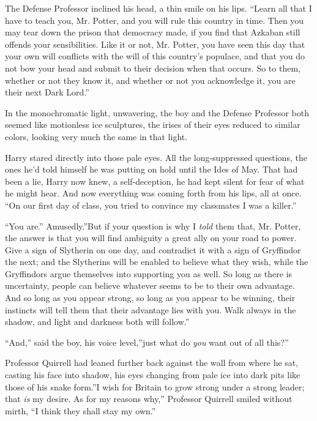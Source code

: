 The Defense Professor inclined his head, a thin smile on his lips.
``Learn all that I have to teach you, Mr. Potter, and you will rule this
country in time. Then you may tear down the prison that democracy made,
if you find that Azkaban still offends your sensibilities. Like it or
not, Mr. Potter, you have seen this day that your own will conflicts
with the will of this country's populace, and that you do not bow your
head and submit to their decision when that occurs. So to them, whether
or not they know it, and whether or not you acknowledge it, you are
their next Dark Lord.''

In the monochromatic light, unwavering, the boy and the Defense
Professor both seemed like motionless ice sculptures, the irises of
their eyes reduced to similar colors, looking very much the same in that
light.

Harry stared directly into those pale eyes. All the long-suppressed
questions, the ones he'd told himself he was putting on hold until the
Ides of May. That had been a lie, Harry now knew, a self-deception, he
had kept silent for fear of what he might hear. And now everything was
coming forth from his lips, all at once. ``On our first day of class,
you tried to convince my classmates I was a killer.''

``You are.'' Amusedly.''But if your question is why I \emph{told} them
that, Mr. Potter, the answer is that you will find ambiguity a great
ally on your road to power. Give a sign of Slytherin on one day, and
contradict it with a sign of Gryffindor the next; and the Slytherins
will be enabled to believe what they wish, while the Gryffindors argue
themselves into supporting you as well. So long as there is uncertainty,
people can believe whatever seems to be to their own advantage. And so
long as you appear strong, so long as you appear to be winning, their
instincts will tell them that their advantage lies with you. Walk always
in the shadow, and light and darkness both will follow.''

``And,'' said the boy, his voice level,''just what do \emph{you} want
out of all this?''

Professor Quirrell had leaned further back against the wall from where
he sat, casting his face into shadow, his eyes changing from pale ice
into dark pits like those of his snake form.''I wish for Britain to grow
strong under a strong leader; that \emph{is} my desire. As for my
reasons why,'' Professor Quirrell smiled without mirth, ``I think they
shall stay my own.''

